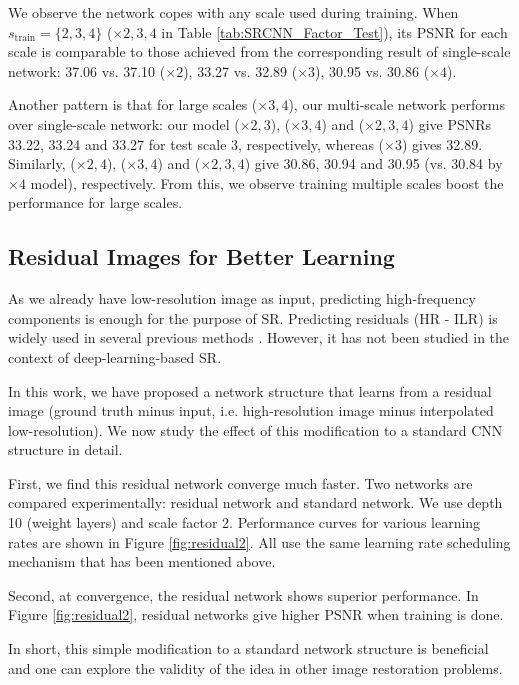 \documentclass[10pt,twocolumn,letterpaper]{article}
\begin{document}
We observe the network copes with any scale used during training. When $s_{\text{train}} = \{2,3,4\}$ ($\times 2, 3, 4$ in Table \ref{tab:SRCNN_Factor_Test}), its PSNR for each scale is comparable to those achieved from the corresponding result of single-scale network: 37.06 vs. 37.10 ($\times 2$), 33.27 vs. 32.89 ($\times 3$), 30.95 vs. 30.86 ($\times 4$).

Another pattern is that for large scales ($\times 3,4$), our multi-scale network performs over single-scale network: our model ($\times 2,3$), ($\times 3,4$) and ($\times 2, 3,4$) give PSNRs 33.22, 33.24 and 33.27 for test scale 3, respectively, whereas ($\times 3$) gives 32.89. Similarly, ($\times 2,4$), ($\times 3,4$) and ($\times 2, 3,4$) give 30.86, 30.94 and 30.95 (vs. 30.84 by $\times 4$ model),  respectively. From this, we observe training multiple scales boost the performance for large scales.

\subsection{Residual Images for Better Learning}
\label{sec:residual}

As we already have low-resolution image as input, predicting high-frequency components is enough for the purpose of SR. Predicting residuals (HR - ILR) is widely used in several previous methods \cite{Timofte2013, Timofte,zeyde2012single}. However, it has not been studied in the context of deep-learning-based SR.

In this work, we have proposed a network structure that learns from a residual image (ground truth minus input, i.e. high-resolution image minus interpolated low-resolution). We now study the effect of this modification to a standard CNN structure in detail. 

First, we find this residual network converge much faster. Two networks are compared experimentally: residual network and standard network. We use depth 10 (weight layers) and scale factor 2. Performance curves for various learning rates are shown in Figure \ref{fig:residual2}. All use the same learning rate scheduling mechanism that has been mentioned above. 

Second, at convergence, the residual network shows superior performance. In Figure \ref{fig:residual2}, residual networks give higher PSNR when training is done. 

In short, this simple modification to a standard network structure is beneficial and one can explore the validity of the idea in other image restoration problems. 
\end{document}
